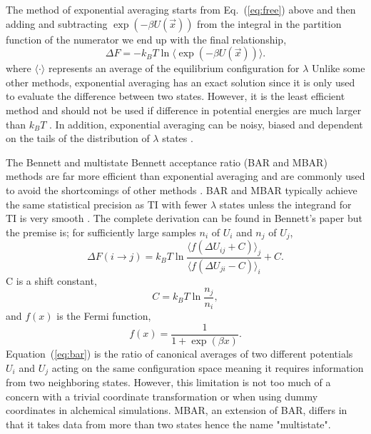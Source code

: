 \documentclass[fleqn,10pt,lineno]{wlpeerj} %
\begin{document}
The method of exponential averaging \citep{Zwanzig1954} starts from Eq.\ (\ref{eq:free}) above and then adding and subtracting $\exp{(-\beta U(\vec{x}))}$ from the integral in the partition function of the numerator we end up with the final relationship,
\begin{equation}\label{eq:exp}
    \Delta F = -k_{B}T \ln \langle \exp{(-\beta U(\vec{x}))} \rangle.
\end{equation}
where $\langle\cdot\rangle$ represents an average of the equilibrium configuration for $\lambda$
Unlike some other methods, exponential averaging has an exact solution since it is only used to evaluate the difference between two states. However, it is the least efficient method and should not be used if difference in potential energies are much larger than $k_{B}T$ \cite{Shirts2005}.
In addition, exponential averaging can be noisy, biased and dependent on the tails of the distribution of $\lambda$ states \citep{Bruckner2011,Shirts2005}.

The Bennett \citep{Bennett1976} and multistate \citep{Shirts2008} Bennett acceptance ratio (BAR and MBAR) methods are far more efficient than exponential averaging and are commonly used to avoid the shortcomings of other methods \citep{Shirts2005, Ytreberg2006}. BAR and MBAR typically achieve the same statistical precision as TI with fewer $\lambda$ states unless the integrand for TI is very smooth \citep{Monticelli2013, Ytreberg2006}. The complete derivation can be found in Bennett's paper \citep{Bennett1976} but the premise is; for sufficiently large samples $n_{i}$ of $U_{i}$ and $n_{j}$ of $U_{j}$,
\begin{equation}\label{eq:bar}
    \Delta F(i \rightarrow j) = k_{B}T \ln{\frac{\langle f(\Delta U_{ij} + C) \rangle_{j}}{\langle f(\Delta U_{ji} - C) \rangle_{i}}} + C.
\end{equation}
C is a shift constant,
\begin{equation}\label{eq:barc}
    C = k_{B}T\ln{\frac{n_{j}}{n_{i}}},
\end{equation} 
and $f(x)$ is the Fermi function,
\begin{equation}\label{eq:fermi}
    f(x) = \frac{1}{1 + \exp(\beta x)}. 
\end{equation}
Equation\ (\ref{eq:bar}) is the ratio of canonical averages of two different potentials $U_{i}$ and $U_{j}$ acting on the same configuration space meaning it requires information from two neighboring states. However, this limitation is not too much of a concern with a trivial coordinate transformation or when using dummy coordinates in alchemical simulations. MBAR, an extension of BAR, differs in that it takes data from more than two states hence the name "multistate".
\end{document}
